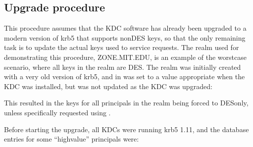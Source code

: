 \documentclass[letterpaper,10pt,english]{sphinxmanual}
\begin{document}
\subsection{Upgrade procedure}
\label{\detokenize{admin/advanced/retiring-des:upgrade-procedure}}
\sphinxAtStartPar
This procedure assumes that the KDC software has already been upgraded
to a modern version of krb5 that supports non\sphinxhyphen{}DES keys, so that the
only remaining task is to update the actual keys used to service requests.
The realm used for demonstrating this procedure, ZONE.MIT.EDU,
is an example of the worst\sphinxhyphen{}case scenario, where all keys in the realm
are DES.  The realm was initially created with a very old version of krb5,
and  in {\hyperref[\detokenize{admin/conf_files/kdc_conf:kdc-conf-5}]{}} was set to a value
appropriate when the KDC was installed, but was not updated as the KDC
was upgraded:

\begin{sphinxVerbatim}[commandchars=\\\{\}]
\PYG{p}{[}\PYG{p}{]}
          
                \PYG{p}{[}\PYG{p}{]}
                  
                       
\end{sphinxVerbatim}

\sphinxAtStartPar
This resulted in the keys for all principals in the realm being forced
to DES\sphinxhyphen{}only, unless specifically requested using {\hyperref[\detokenize{admin/admin_commands/kadmin_local:kadmin-1}]{}}.

\sphinxAtStartPar
Before starting the upgrade, all KDCs were running krb5 1.11,
and the database entries for some “high\sphinxhyphen{}value” principals were:
\end{document}
